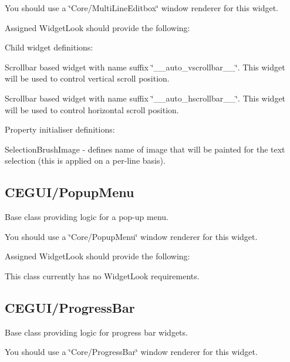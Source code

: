 You should use a \char`\"{}\+Core/\+Multi\+Line\+Editbox\char`\"{} window renderer for this widget.

Assigned Widget\+Look should provide the following\+: 
\begin{DoxyItemize}
\item Child widget definitions\+: 
\begin{DoxyItemize}
\item Scrollbar based widget with name suffix \char`\"{}\+\_\+\+\_\+auto\+\_\+vscrollbar\+\_\+\+\_\+\char`\"{}. This widget will be used to control vertical scroll position. 
\item Scrollbar based widget with name suffix \char`\"{}\+\_\+\+\_\+auto\+\_\+hscrollbar\+\_\+\+\_\+\char`\"{}. This widget will be used to control horizontal scroll position. 
\end{DoxyItemize}


\item Property initialiser definitions\+: 
\begin{DoxyItemize}
\item Selection\+Brush\+Image -\/ defines name of image that will be painted for the text selection (this is applied on a per-\/line basis). 
\end{DoxyItemize}
\end{DoxyItemize}\hypertarget{fal_baseclass_ref_fal_baseclass_ref_sec_17}{}\subsection{C\+E\+G\+U\+I/\+Popup\+Menu}\label{fal_baseclass_ref_fal_baseclass_ref_sec_17}
Base class providing logic for a pop-\/up menu.

You should use a \char`\"{}\+Core/\+Popup\+Menu\char`\"{} window renderer for this widget.

Assigned Widget\+Look should provide the following\+: 
\begin{DoxyItemize}
\item This class currently has no Widget\+Look requirements. 
\end{DoxyItemize}\hypertarget{fal_baseclass_ref_fal_baseclass_ref_sec_18}{}\subsection{C\+E\+G\+U\+I/\+Progress\+Bar}\label{fal_baseclass_ref_fal_baseclass_ref_sec_18}
Base class providing logic for progress bar widgets.

You should use a \char`\"{}\+Core/\+Progress\+Bar\char`\"{} window renderer for this widget.

